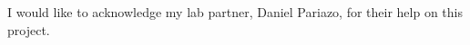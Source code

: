 \documentclass[
    aps, 
    twocolumn, 
    secnumarabic, 
    balancelastpage, 
    amsmath, 
    amssymb, 
    nofootinbib, 
    floatfix
]{revtex4-2}
\begin{document}

\begin{acknowledgments} 

I would like to acknowledge my lab partner, Daniel Pariazo, for their help on this project.

\end{acknowledgments}





\clearpage

\end{document}
